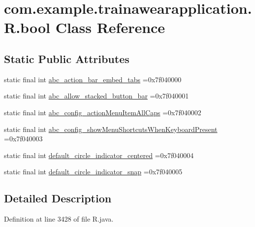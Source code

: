 \hypertarget{classcom_1_1example_1_1trainawearapplication_1_1_r_1_1bool}{}\section{com.\+example.\+trainawearapplication.\+R.\+bool Class Reference}
\label{classcom_1_1example_1_1trainawearapplication_1_1_r_1_1bool}
\subsection*{Static Public Attributes}
\begin{DoxyCompactItemize}
\item 
static final int \mbox{\hyperlink{classcom_1_1example_1_1trainawearapplication_1_1_r_1_1bool_adf7685ad107f74aeff8db962bafe7143}{abc\+\_\+action\+\_\+bar\+\_\+embed\+\_\+tabs}} =0x7f040000
\item 
static final int \mbox{\hyperlink{classcom_1_1example_1_1trainawearapplication_1_1_r_1_1bool_a36893d1c55b48b6e85706534d0d4377c}{abc\+\_\+allow\+\_\+stacked\+\_\+button\+\_\+bar}} =0x7f040001
\item 
static final int \mbox{\hyperlink{classcom_1_1example_1_1trainawearapplication_1_1_r_1_1bool_abc470d206745bbc23e3be1a76c392b82}{abc\+\_\+config\+\_\+action\+Menu\+Item\+All\+Caps}} =0x7f040002
\item 
static final int \mbox{\hyperlink{classcom_1_1example_1_1trainawearapplication_1_1_r_1_1bool_a3c47d1804fd85821371dc204e8eb0204}{abc\+\_\+config\+\_\+show\+Menu\+Shortcuts\+When\+Keyboard\+Present}} =0x7f040003
\item 
static final int \mbox{\hyperlink{classcom_1_1example_1_1trainawearapplication_1_1_r_1_1bool_ae74a00793e0e5f71e20fdb31d152a4c3}{default\+\_\+circle\+\_\+indicator\+\_\+centered}} =0x7f040004
\item 
static final int \mbox{\hyperlink{classcom_1_1example_1_1trainawearapplication_1_1_r_1_1bool_a9b060d1e8dac047d3a6e659b17039612}{default\+\_\+circle\+\_\+indicator\+\_\+snap}} =0x7f040005
\end{DoxyCompactItemize}


\subsection{Detailed Description}


Definition at line 3428 of file R.\+java.



